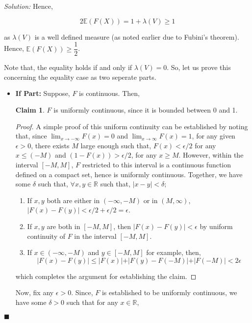 \documentclass[12pt]{article}
\newcommand{\R}{\mathbb{R}}
\newcommand{\E}{\mathbb{E}}
\theoremstyle{definition}
\newenvironment{answer}{\textit{Solution: }\quad }{ \hfill $\blacksquare$}
\newtheorem{claim}{Claim}
\begin{document}
\begin{answer}
	Hence,

	$$2\E(F(X)) = 1 + \lambda(V) \geq 1$$

	as $\lambda(V)$ is a well defined measure (as noted earlier due to Fubini's theorem). Hence, $\E(F(X)) \geq \dfrac{1}{2}$.

	Note that, the equality holds if and only if $\lambda(V) = 0$. So, let us prove this concerning the equality case as two seperate parts.

	\begin{itemize}
		\item \textbf{If Part:} Suppose, $F$ is continuous. Then,
		
		\begin{claim}
			$F$ is uniformly continuous, since it is bounded between 0 and 1. 
		\end{claim}
		
		\begin{proof}
			A simple proof of this uniform continuity can be established by noting that, since $\lim_{x \rightarrow -\infty} F(x) = 0$ and $\lim_{x \rightarrow \infty} F(x) = 1$, for any given $\epsilon>0$, there exists $M$ large enough such that, $F(x) < \epsilon/2$ for any $x \leq (-M)$ and $(1 - F(x)) > \epsilon/2$, for any $x \geq M$. However, within the interval $[-M, M]$, $F$ restricted to this interval is a continuous function defined on a compact set, hence is uniformly continuous. Together, we have some $\delta$ such that, $\forall x, y \in \R$ such that, $\vert x - y\vert < \delta$;

		\begin{enumerate}
			\item If $x, y$ both are either in $(-\infty, -M)$ or in $(M, \infty)$, $\vert F(x) - F(y) \vert < \epsilon/2 + \epsilon/2 = \epsilon$.
			\item If $x, y$ are both in $[-M, M]$, then $\vert F(x) - F(y) \vert < \epsilon$ by uniform continuity of $F$ in the interval $[-M, M]$.
			\item If $x \in (-\infty, -M)$ and $y \in [-M, M]$ for example, then, 
			$$\vert F(x) - F(y) \vert \leq \vert F(x) \vert + \vert F(y) - F(-M) \vert + \vert F(-M) \vert < 2\epsilon$$ 
		\end{enumerate}

			which completes the argument for establishing the claim.
		\end{proof}

		Now, fix any $\epsilon> 0$. Since, $F$ is established to be uniformly continuous, we have some $\delta > 0$ such that for any $x \in \R$,
		

\end{itemize}
\end{answer}
\end{document}
